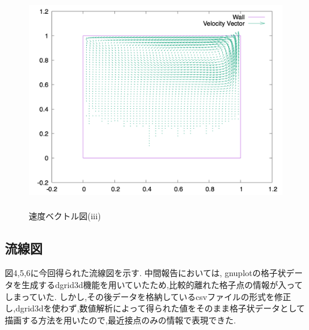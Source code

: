 \documentclass[upLaTeX,a4paper]{jsarticle}
\begin{document}
\begin{figure}[H]
  \centering
  \includegraphics[height=9.5cm]{outputs/img/velocity_vector_re500.png}
  \caption{速度ベクトル図(iii)}
  \label{fig:velocity_vector_re500}
\end{figure}


\subsection{流線図}

図4,5,6に今回得られた流線図を示す.
中間報告においては, gnuplotの格子状データを生成するdgrid3d機能を用いていたため,比較的離れた格子点の情報が入ってしまっていた.
しかし,その後データを格納しているcsvファイルの形式を修正し,dgrid3dを使わず,数値解析によって得られた値をそのまま格子状データとして描画する方法を用いたので,最近接点のみの情報で表現できた.
\end{document}
